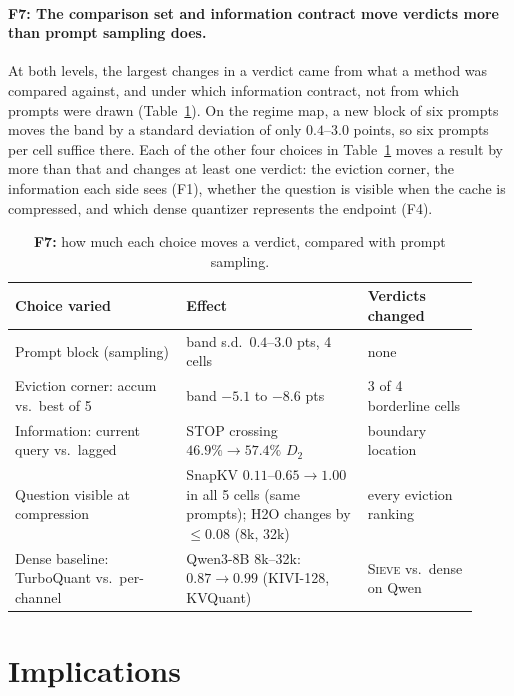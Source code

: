 \documentclass{article}
\newcommand{\sieve}{\textsc{Sieve}}
\theoremstyle{definition}
\begin{document}
\paragraph{F7: The comparison set and information contract move verdicts more than prompt sampling does.}
At both levels, the largest changes in a verdict came from what a method was compared against, and under which information contract, not from which prompts were drawn (Table~\ref{tab:contract}).  On the regime map, a new block of six prompts moves the band by a standard deviation of only $0.4$--$3.0$ points, so six prompts per cell suffice there.  Each of the other four choices in Table~\ref{tab:contract} moves a result by more than that and changes at least one verdict: the eviction corner, the information each side sees (F1), whether the question is visible when the cache is compressed, and which dense quantizer represents the endpoint (F4).
\begin{table}[t]
\centering
\small
\setlength{\tabcolsep}{4pt}
\caption{\textbf{F7:} how much each choice moves a verdict, compared with prompt sampling.}
\label{tab:contract}
\begin{tabular}{@{}p{0.34\linewidth}p{0.36\linewidth}p{0.22\linewidth}@{}}
\toprule
\textbf{Choice varied} & \textbf{Effect} & \textbf{Verdicts changed} \\
\midrule
Prompt block (sampling) & band s.d.\ $0.4$--$3.0$ pts, 4 cells & none \\
Eviction corner: accum vs.\ best of 5 & band $-5.1$ to $-8.6$ pts & 3 of 4 borderline cells \\
Information: current query vs.\ lagged & STOP crossing $46.9\%\to57.4\%$ $D_2$ & boundary location \\
Question visible at compression & SnapKV $0.11$--$0.65\to1.00$ in all 5 cells (same prompts); H2O changes by $\le0.08$ (8k, 32k) & every eviction ranking \\
Dense baseline: TurboQuant vs.\ per-channel & Qwen3-8B 8k--32k: $0.87\to0.99$ (KIVI-128, KVQuant) & \sieve{} vs.\ dense on Qwen \\
\bottomrule
\end{tabular}
\vspace{-2mm}
\end{table}


\section{Implications}
\label{sec:implications}
\end{document}
